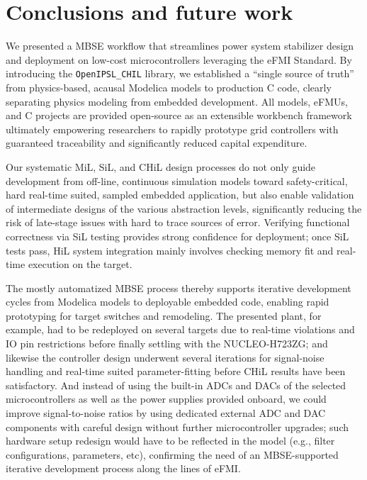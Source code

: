 \section{Conclusions and future work}\label{sec:conclu}

We presented a MBSE workflow that streamlines power system stabilizer design and deployment on low-cost microcontrollers leveraging the eFMI Standard. By introducing the \texttt{OpenIPSL\_CHIL} library, we established a ``single source of truth'' from physics-based, acausal Modelica models to production C code, clearly separating physics modeling from embedded development. All models, eFMUs, and C projects are provided open-source as an extensible workbench framework ultimately empowering researchers to rapidly prototype grid controllers with guaranteed traceability and significantly reduced capital expenditure.

Our systematic MiL, SiL, and CHiL design processes do not only guide development from off-line, continuous simulation models toward safety-critical, hard real-time suited, sampled embedded application, but also enable validation of intermediate designs of the various abstraction levels, significantly reducing the risk of late-stage issues with hard to trace sources of error. Verifying functional correctness via SiL testing provides strong confidence for deployment; once SiL tests pass, HiL system integration mainly involves checking memory fit and real-time execution on the target.

The mostly automatized MBSE process thereby supports iterative development cycles from Modelica models to deployable embedded code, enabling rapid prototyping for target switches and remodeling. The presented plant, for example, had to be redeployed on several targets due to real-time violations and IO pin restrictions before finally settling with the NUCLEO-H723ZG; and likewise the controller design underwent several iterations for signal-noise handling and real-time suited parameter-fitting before CHiL results have been satisfactory. And instead of using the built-in ADCs and DACs of the selected microcontrollers as well as the power supplies provided onboard, we could improve signal-to-noise ratios by using dedicated external ADC and DAC components with careful design without further microcontroller upgrades; such hardware setup redesign would have to be reflected in the model (e.g., filter configurations, parameters, etc), confirming the need of an MBSE-supported iterative development process along the lines of eFMI.

